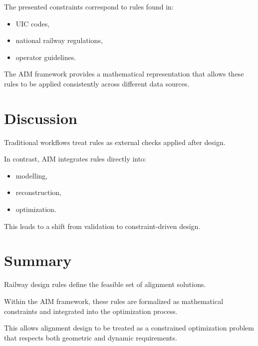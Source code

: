 The presented constraints correspond to rules found in:
\begin{itemize}
\item UIC codes,
\item national railway regulations,
\item operator guidelines.
\end{itemize}

The AIM framework provides a mathematical representation that allows
these rules to be applied consistently across different data sources.


\section{Discussion}

Traditional workflows treat rules as external checks applied after
design.

In contrast, AIM integrates rules directly into:
\begin{itemize}
\item modelling,
\item reconstruction,
\item optimization.
\end{itemize}

This leads to a shift from validation to constraint-driven design.


\section{Summary}

\begin{summary}
Railway design rules define the feasible set of alignment solutions.

Within the AIM framework, these rules are formalized as mathematical
constraints and integrated into the optimization process.

This allows alignment design to be treated as a constrained optimization
problem that respects both geometric and dynamic requirements.
\end{summary}
